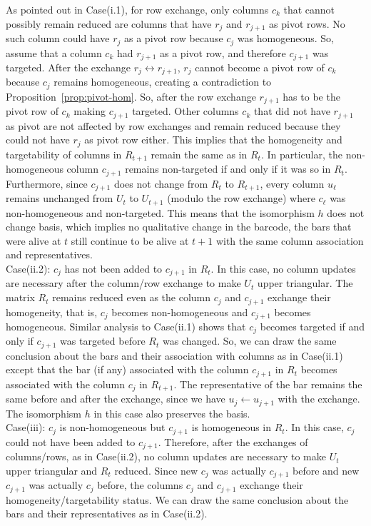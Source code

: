 \documentclass[letterpaper,11pt]{article}
\theoremstyle{plain}
\theoremstyle{definition}
\newcounter{li}
\begin{document}
As pointed out in Case(i.1), for row exchange, only columns $c_k$ that cannot possibly remain reduced are columns that have $r_j$ and $r_{j+1}$ as pivot rows.
No such column could have $r_{j}$ as a pivot row because $c_{j}$ was
homogeneous. So, assume that a column $c_k$ had $r_{j+1}$ as a pivot row, and therefore $c_{j+1}$ was targeted. After the exchange $r_j\leftrightarrow r_{j+1}$, $r_{j}$ cannot become a pivot row
of $c_k$ because $c_{j}$ remains homogeneous, creating a contradiction
to Proposition~\ref{prop:pivot-hom}. So, after the row exchange
$r_{j+1}$ has to be the pivot row of $c_k$ making $c_{j+1}$ targeted.
Other columns $c_k$ that did not have $r_{j+1}$ as pivot are not affected
by row exchanges and remain reduced because they could not have $r_j$ as pivot row either. This implies that the homogeneity and targetability of columns
in $R_{t+1}$ remain the same as in $R_t$. In particular, the
non-homogeneous column $c_{j+1}$ remains non-targeted if and only if it was so in
$R_t$. Furthermore, since $c_{j+1}$ does not change from $R_t$ to $R_{t+1}$,
every column $u_\ell$ remains unchanged from $U_t$ to $U_{t+1}$ (modulo the row exchange) where $c_\ell$
was non-homogeneous and non-targeted. This means that the isomorphism $h$ does not
change basis, which implies no qualitative change in the barcode, 
the bars that were alive at $t$ still continue to be alive at $t+1$ with the same column
association and representatives.\\

Case(ii.2): $c_j$ has not been added to $c_{j+1}$ in $R_t$. In this case, no column
updates are necessary after the column/row exchange to make $U_t$ upper triangular.
The matrix $R_t$ remains reduced even as the column $c_j$ and $c_{j+1}$
exchange their homogeneity, that is, $c_j$ becomes non-homogeneous
and $c_{j+1}$ becomes homogeneous. Similar analysis to Case(ii.1) shows that
$c_j$ becomes targeted if and only if $c_{j+1}$ was targeted before $R_t$ was changed.
So, we can draw the same conclusion about the bars and their association with columns
as in Case(ii.1) except that the bar (if any) associated with the column $c_{j+1}$ in $R_t$ becomes associated with the column $c_j$ in $R_{t+1}$.
The representative of the
bar remains the same before and after the exchange, since
we have $u_{j}\leftarrow u_{j+1}$ with the exchange. The isomorphism
$h$ in this case also preserves the basis.\\

Case(iii): $c_j$ is non-homogeneous but $c_{j+1}$ is homogeneous in $R_t$.
In this case, $c_j$ could not have been added to $c_{j+1}$. Therefore, after the exchanges of columns/rows, as in Case(ii.2), no column
updates are necessary to make $U_t$ upper triangular and $R_t$ reduced.
Since new $c_j$ was actually $c_{j+1}$ before and new $c_{j+1}$ was actually
$c_j$ before, the
columns $c_j$ and $c_{j+1}$ exchange their homogeneity/targetability status.
We can draw the same conclusion about the bars and their representatives as in Case(ii.2).\\
\end{document}
